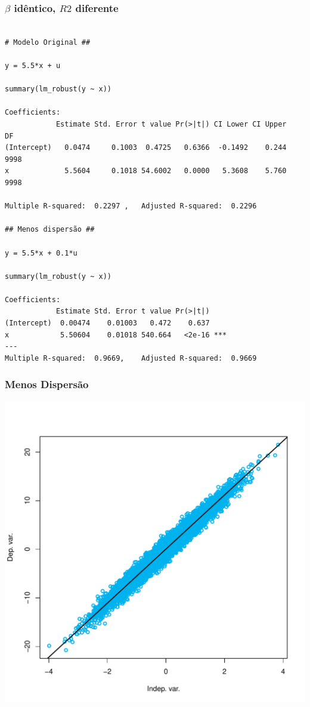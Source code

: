 \documentclass[10pt,slides,xcolor=pdftex,dvipsnames,table]{beamer}
\begin{document}
\begin{frame}[fragile]
	\frametitle{$\beta$ idêntico, $R2$ diferente}

\begin{lstlisting}

# Modelo Original ##

y = 5.5*x + u 

summary(lm_robust(y ~ x))

Coefficients:
            Estimate Std. Error t value Pr(>|t|) CI Lower CI Upper   DF
(Intercept)   0.0474     0.1003  0.4725   0.6366  -0.1492    0.244 9998
x             5.5604     0.1018 54.6002   0.0000   5.3608    5.760 9998

Multiple R-squared:  0.2297 ,	Adjusted R-squared:  0.2296 

## Menos dispersão ##

y = 5.5*x + 0.1*u

summary(lm_robust(y ~ x))

Coefficients:
            Estimate Std. Error t value Pr(>|t|)    
(Intercept)  0.00474    0.01003   0.472    0.637    
x            5.50604    0.01018 540.664   <2e-16 ***
---
Multiple R-squared:  0.9669,	Adjusted R-squared:  0.9669 

\end{lstlisting}

\end{frame}


\begin{frame}[fragile]
	\frametitle{Menos Dispersão}
	
    \centering
    \includegraphics[height=\textheight]{fit_melhor}

\end{frame}
\end{document}
